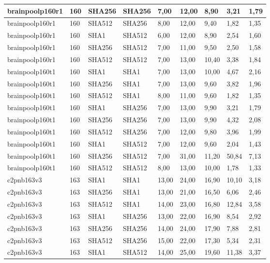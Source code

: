 \begin{longtable}{| l | l | l | l | l |l |l |l |l |}
brainpoolp160r1 & 160 & SHA256 & SHA256 & 7,00 & 12,00 & 8,90 & 3,21 & 1,79 \\ \hline 
brainpoolp160r1 & 160 & SHA512 & SHA256 & 8,00 & 12,00 & 9,40 & 1,82 & 1,35 \\ \hline 
brainpoolp160r1 & 160 & SHA1 & SHA512 & 6,00 & 12,00 & 8,90 & 2,54 & 1,60 \\ \hline 
brainpoolp160r1 & 160 & SHA256 & SHA512 & 7,00 & 11,00 & 9,50 & 2,50 & 1,58 \\ \hline 
brainpoolp160r1 & 160 & SHA512 & SHA512 & 7,00 & 13,00 & 10,40 & 3,38 & 1,84 \\ \hline 
brainpoolp160t1 & 160 & SHA1 & SHA1 & 7,00 & 13,00 & 10,00 & 4,67 & 2,16 \\ \hline 
brainpoolp160t1 & 160 & SHA256 & SHA1 & 7,00 & 13,00 & 9,60 & 3,82 & 1,96 \\ \hline 
brainpoolp160t1 & 160 & SHA512 & SHA1 & 8,00 & 11,00 & 9,60 & 1,82 & 1,35 \\ \hline 
brainpoolp160t1 & 160 & SHA1 & SHA256 & 7,00 & 13,00 & 9,90 & 3,21 & 1,79 \\ \hline 
brainpoolp160t1 & 160 & SHA256 & SHA256 & 7,00 & 13,00 & 9,90 & 4,32 & 2,08 \\ \hline 
brainpoolp160t1 & 160 & SHA512 & SHA256 & 7,00 & 12,00 & 9,80 & 3,96 & 1,99 \\ \hline 
brainpoolp160t1 & 160 & SHA1 & SHA512 & 7,00 & 12,00 & 9,60 & 2,04 & 1,43 \\ \hline 
brainpoolp160t1 & 160 & SHA256 & SHA512 & 7,00 & 31,00 & 11,20 & 50,84 & 7,13 \\ \hline 
brainpoolp160t1 & 160 & SHA512 & SHA512 & 8,00 & 13,00 & 10,00 & 1,78 & 1,33 \\ \hline 
c2pnb163v3 & 163 & SHA1 & SHA1 & 13,00 & 24,00 & 16,90 & 10,10 & 3,18 \\ \hline 
c2pnb163v3 & 163 & SHA256 & SHA1 & 13,00 & 21,00 & 16,50 & 6,06 & 2,46 \\ \hline 
c2pnb163v3 & 163 & SHA512 & SHA1 & 14,00 & 23,00 & 16,80 & 12,84 & 3,58 \\ \hline 
c2pnb163v3 & 163 & SHA1 & SHA256 & 13,00 & 22,00 & 16,90 & 8,54 & 2,92 \\ \hline 
c2pnb163v3 & 163 & SHA256 & SHA256 & 14,00 & 24,00 & 17,90 & 7,88 & 2,81 \\ \hline 
c2pnb163v3 & 163 & SHA512 & SHA256 & 15,00 & 22,00 & 17,30 & 5,34 & 2,31 \\ \hline 
c2pnb163v3 & 163 & SHA1 & SHA512 & 14,00 & 25,00 & 19,60 & 11,38 & 3,37 \\ \hline 

\end{longtable}
